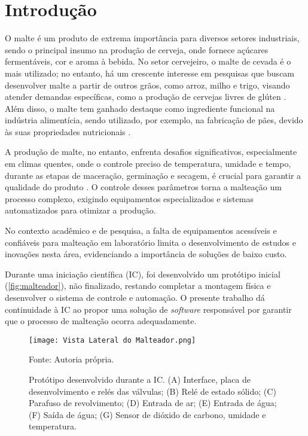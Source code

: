 \chapter[Introdução]{Introdução}

O malte é um produto de extrema importância para diversos setores industriais, sendo o principal insumo na produção de cerveja, onde fornece açúcares fermentáveis, cor e aroma à bebida. No setor cervejeiro, o malte de cevada é o mais utilizado; no entanto, há um crescente interesse em pesquisas que buscam desenvolver malte a partir de outros grãos, como arroz, milho e trigo, visando atender demandas específicas, como a produção de cervejas livres de glúten \cite{CECCARONI2019}. Além disso, o malte tem ganhado destaque como ingrediente funcional na indústria alimentícia, sendo utilizado, por exemplo, na fabricação de pães, devido às suas propriedades nutricionais \cite{KOISTINEN2020}.

A produção de malte, no entanto, enfrenta desafios significativos, especialmente em climas quentes, onde o controle preciso de temperatura, umidade e tempo, durante as etapas de maceração, germinação e secagem, é crucial para garantir a qualidade do produto \cite{KOVALOVA2024}. O controle desses parâmetros torna a malteação um processo complexo, exigindo equipamentos especializados e sistemas automatizados para otimizar a produção. 

No contexto acadêmico e de pesquisa, a falta de equipamentos acessíveis e confiáveis para malteação em laboratório limita o desenvolvimento de estudos e inovações nesta área, evidenciando a importância de soluções de baixo custo.

Durante uma iniciação científica (IC), foi desenvolvido um protótipo inicial (\autoref{fig:malteador}), não finalizado, restando completar a montagem física e desenvolver o sistema de controle e automação. O presente trabalho dá continuidade à IC ao propor uma solução de \textit{software} responsável por garantir que o processo de malteação ocorra adequadamente. 

\begin{figure}[ht]
    \centering
    \caption{Protótipo desenvolvido durante a IC. (A) Interface, placa de desenvolvimento e relés das válvulas; (B) Relé de estado sólido; (C) Parafuso de revolvimento; (D) Entrada de ar; (E) Entrada de água; (F) Saída de água; (G) Sensor de dióxido de carbono, umidade e temperatura.}  
    \label{fig:malteador}
    \texttt{[image: Vista Lateral do Malteador.png]}

    {\centering\footnotesize Fonte: Autoria própria.\par}
\end{figure}

